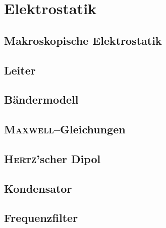 \newpage
\section{Elektrostatik}
\subsection{Makroskopische Elektrostatik}
\subsection{Leiter}
\subsection{Bändermodell}
\subsection{\textsc{Maxwell}--Gleichungen}
\subsection{\textsc{Hertz}'scher Dipol}
\subsection{Kondensator}
\subsection{Frequenzfilter}


